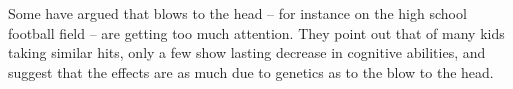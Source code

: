  Some have argued that blows to the head -- for instance on the
    high school football field -- are getting too much attention.
    They point out that of many kids taking similar hits, only a few
    show lasting decrease in cognitive abilities, and suggest that the
    effects are as  much due to genetics as to the blow to the head.
    \begin{enumerate}
  


    


\end{enumerate}
